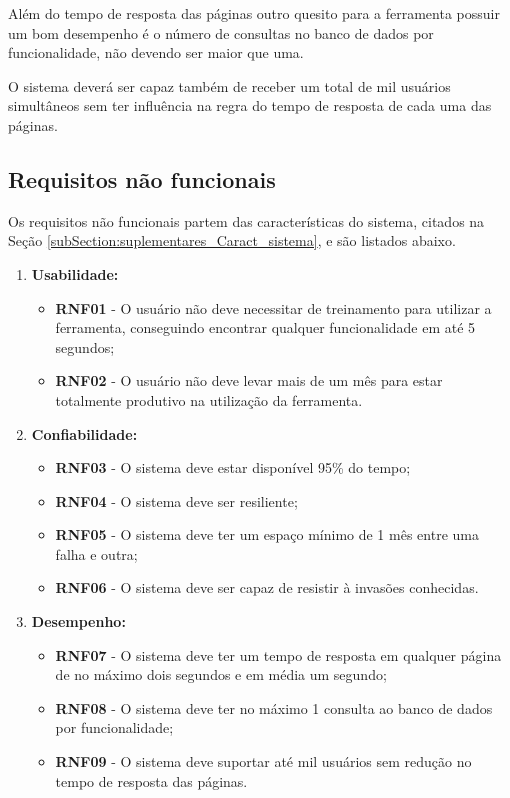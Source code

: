 	Além do tempo de resposta das páginas outro quesito para a ferramenta possuir um bom desempenho é o número de consultas no banco de dados por funcionalidade, não devendo ser maior que uma.

	O sistema deverá ser capaz também de receber um total de mil usuários simultâneos sem ter influência na regra do tempo de resposta de cada uma das páginas.

\subsection{Requisitos não funcionais}

	Os requisitos não funcionais partem das características do sistema, citados na Seção \ref{subSection:suplementares_Caract_sistema}, e são listados abaixo. 

	\begin{enumerate}
		\item \textbf{Usabilidade:}
			\begin{itemize}
				\item \textbf{RNF01} - O usuário não deve necessitar de treinamento para utilizar a ferramenta, conseguindo encontrar qualquer funcionalidade em até 5 segundos;
				\item \textbf{RNF02} - O usuário não deve levar mais de um mês para estar totalmente produtivo na utilização da ferramenta.
			\end{itemize}
		\item \textbf{Confiabilidade:}
			\begin{itemize}
				\item \textbf{RNF03} - O sistema deve estar disponível 95\% do tempo;
				\item \textbf{RNF04} - O sistema deve ser resiliente;
				\item \textbf{RNF05} - O sistema deve ter um espaço mínimo de 1 mês entre uma falha e outra;
				\item \textbf{RNF06} - O sistema deve ser capaz de resistir à invasões conhecidas.
			\end{itemize}
		\item \textbf{Desempenho:}
			\begin{itemize}
				\item \textbf{RNF07} - O sistema deve ter um tempo de resposta em qualquer página de no máximo dois segundos e em média um segundo;
				\item \textbf{RNF08} - O sistema deve ter no máximo 1 consulta ao banco de dados por funcionalidade;
				\item \textbf{RNF09} - O sistema deve suportar até mil usuários sem redução no tempo de resposta das páginas.
			\end{itemize}
	\end{enumerate}